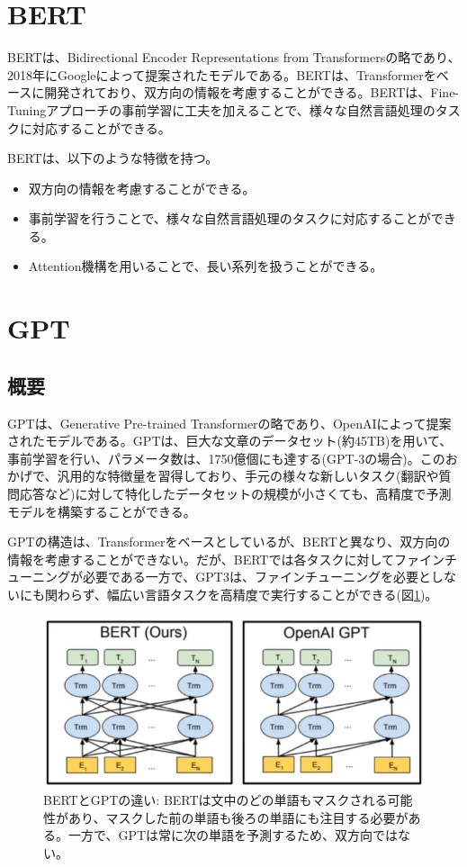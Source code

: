 \documentclass{ltjsarticle}
\begin{document}
\clearpage
\section{BERT}
BERTは、Bidirectional Encoder Representations from Transformersの略であり、2018年にGoogleによって提案されたモデルである。BERTは、Transformerをベースに開発されており、双方向の情報を考慮することができる。BERTは、Fine-Tuningアプローチの事前学習に工夫を加えることで、様々な自然言語処理のタスクに対応することができる。
\par
BERTは、以下のような特徴を持つ。
\begin{itemize}
  \item 双方向の情報を考慮することができる。
  \item 事前学習を行うことで、様々な自然言語処理のタスクに対応することができる。
  \item Attention機構を用いることで、長い系列を扱うことができる。
\end{itemize}

\clearpage
\section{GPT}
\subsection{概要}
GPTは、Generative Pre-trained Transformerの略であり、OpenAIによって提案されたモデルである。GPTは、巨大な文章のデータセット(約45TB)を用いて、事前学習を行い、パラメータ数は、1750億個にも達する(GPT-3の場合)。このおかげで、汎用的な特徴量を習得しており、手元の様々な新しいタスク(翻訳や質問応答など)に対して特化したデータセットの規模が小さくても、高精度で予測モデルを構築することができる。
\par
GPTの構造は、Transformerをベースとしているが、BERTと異なり、双方向の情報を考慮することができない。だが、BERTでは各タスクに対してファインチューニングが必要である一方で、GPT3は、ファインチューニングを必要としないにも関わらず、幅広い言語タスクを高精度で実行することができる(図\ref{fig:BERT_GPT})。
\begin{figure}[htbp]
  \centering
  \includegraphics[width=12cm]{./capture/BERT_GPT.png}
  \caption{BERTとGPTの違い: BERTは文中のどの単語もマスクされる可能性があり、マスクした前の単語も後ろの単語にも注目する必要がある。一方で、GPTは常に次の単語を予測するため、双方向ではない。}
  \label{fig:BERT_GPT}
\end{figure}
\end{document}
